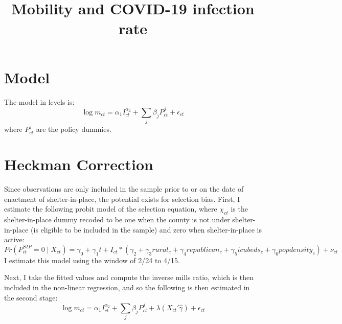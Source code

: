 \documentclass{article}
\title{Mobility and COVID-19 infection rate}
\author{}
\date{}
\begin{document}
\maketitle

\section{Model}
The model in levels is:
$$
\log m_{ct} = \alpha_1 I_{ct} ^ {\alpha_2} + \sum_j \beta_j P_{ct}^j + \epsilon_{ct}
$$
where $P_{ct}^j$ are the policy dummies.

\section{Heckman Correction}
Since observations are only included in the sample prior to or on the date of enactment of shelter-in-place, the potential exists for selection bias. First, I estimate the following probit model of the selection equation, where $\chi_{ct}$ is the shelter-in-place dummy recoded to be one when the county is not under shelter-in-place (is eligible to be included in the sample) and zero when shelter-in-place is active:
$$
Pr(P_{ct}^{SIP} = 0 \mid X_{ct})
= \gamma_0 + \gamma_1 t +
I_{ct} * (\gamma_2 + \gamma_3 rural_c + \gamma_4 republican_c + \gamma_5 icubeds_c + \gamma_6 popdensity_c) + \nu_{ct}
$$
I estimate this model using the window of 2/24 to 4/15.

Next, I take the fitted values and compute the inverse mills ratio, which is then included in the non-linear regression, and so the following is then estimated in the second stage:
$$
\log m_{ct} = \alpha_1 I_{ct} ^ {\alpha_2} + \sum_j \beta_j P_{ct}^j + \lambda(X_{ct}'\hat{\gamma}) + \epsilon_{ct}
$$
\end{document}
